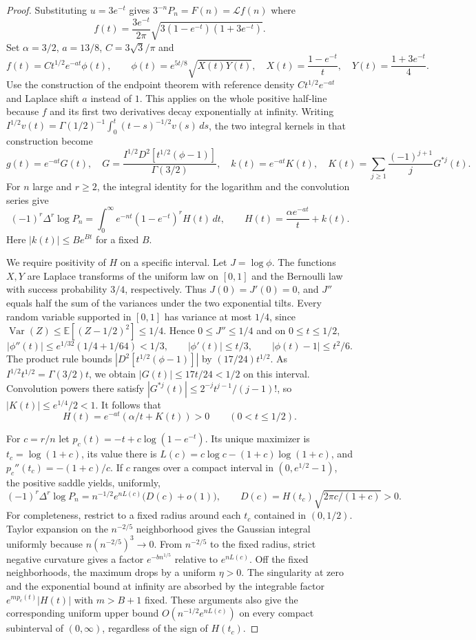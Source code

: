 \documentclass[11pt,a4paper]{article}
\begin{document}
\begin{proof}
Substituting $u=3e^{-t}$ gives $3^{-n}P_n=F(n)=\mathcal L f(n)$ where \[ f(t)=\frac{3e^{-t}}{2\pi}\sqrt{3(1-e^{-t})(1+3e^{-t})}. \] Set $\alpha=3/2$, $a=13/8$, $C=3\sqrt3/\pi$ and
\[
 f(t)=Ct^{1/2}e^{-at}\phi(t),\qquad
 \phi(t)=e^{5t/8}\sqrt{X(t)Y(t)},\quad
 X(t)=\frac{1-e^{-t}}t,\quad Y(t)=\frac{1+3e^{-t}}4.
\]
Use the construction of the endpoint theorem with reference density $Ct^{1/2}e^{-at}$ and Laplace shift $a$ instead of $1$. This applies on the whole positive half-line because $f$ and its first two derivatives decay exponentially at infinity. Writing $I^{1/2}v(t)=\Gamma(1/2)^{-1}\int_0^t(t-s)^{-1/2}v(s)\,ds$, the two integral kernels in that construction become
\[
 g(t)=e^{-at}G(t),\quad G=\frac{I^{1/2} D^2[t^{1/2}(\phi-1)]}{\Gamma(3/2)},\quad
 k(t)=e^{-at}K(t),\quad K(t)=\sum_{j\ge1}\frac{(-1)^{j+1}}jG^{*j}(t).
\]
For $n$ large and $r\ge2$, the integral identity for the logarithm and the convolution series give
\[
 (-1)^r\Delta^r\log P_n
 =\int_0^\infty e^{-nt}(1-e^{-t})^r H(t)\,dt,
 \qquad H(t)=\frac{\alpha e^{-at}}{t}+k(t).
\]
Here $|k(t)|\le B e^{Bt}$ for a fixed $B$.

We require positivity of $H$ on a specific interval. Let $J=\log\phi$. The functions $X,Y$ are Laplace transforms of the uniform law on $[0,1]$ and the Bernoulli law with success probability $3/4$, respectively. Thus $J(0)=J'(0)=0$, and $J''$ equals half the sum of the variances under the two exponential tilts. Every random variable supported in $[0,1]$ has variance at most $1/4$, since $\operatorname{Var}(Z)\le\mathbb E[(Z-1/2)^2]\le1/4$. Hence $0\le J''\le1/4$ and on $0\le t\le1/2$,
\[
 |\phi''(t)|\le e^{1/32}(1/4+1/64)<1/3,\qquad
 |\phi'(t)|\le t/3,\qquad |\phi(t)-1|\le t^2/6.
\]
The product rule bounds $|D^2[t^{1/2}(\phi-1)]|$ by $(17/24)t^{1/2}$. As $I^{1/2}t^{1/2}=\Gamma(3/2)t$, we obtain $|G(t)|\le17t/24<1/2$ on this interval. Convolution powers there satisfy $|G^{*j}(t)|\le 2^{-j}t^{j-1}/(j-1)!$, so $|K(t)|\le e^{1/4}/2<1$. It follows that
\[
 H(t)=e^{-at}(\alpha/t+K(t))>0\qquad (0<t\le1/2).
\]

For $c=r/n$ let $p_c(t)=-t+c\log(1-e^{-t})$. Its unique maximizer is $t_c=\log(1+c)$, its value there is $L(c)=c\log c-(1+c)\log(1+c)$, and $p_c''(t_c)=-(1+c)/c$. If $c$ ranges over a compact interval in $(0,e^{1/2}-1)$, the positive saddle yields, uniformly,
\[
 (-1)^r\Delta^r\log P_n=n^{-1/2}e^{nL(c)}\bigl(D(c)+o(1)\bigr),\qquad
 D(c)=H(t_c)\sqrt{2\pi c/(1+c)}>0.
\]
For completeness, restrict to a fixed radius around each $t_c$ contained in $(0,1/2)$. Taylor expansion on the $n^{-2/5}$ neighborhood gives the Gaussian integral uniformly because $n(n^{-2/5})^3\to0$. From $n^{-2/5}$ to the fixed radius, strict negative curvature gives a factor $e^{-b n^{1/5}}$ relative to $e^{nL(c)}$. Off the fixed neighborhoods, the maximum drops by a uniform $\eta>0$. The singularity at zero and the exponential bound at infinity are absorbed by the integrable factor $e^{m p_c(t)}|H(t)|$ with $m>B+1$ fixed. These arguments also give the corresponding uniform upper bound $O(n^{-1/2}e^{nL(c)})$ on every compact subinterval of $(0,\infty)$, regardless of the sign of $H(t_c)$.


\end{proof}
\end{document}
